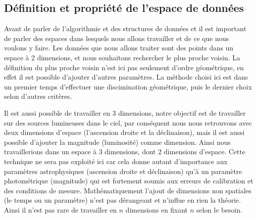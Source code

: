 	\subsection{Définition et propriété de l'espace de données}

Avant de parler de l'algorithmie et des structures de données et il est important de parler des espaces dans lesquels nous allons travailler et de ce que nous voulons y faire. Les données que nous allons traiter sont des points dans un espace à 2 dimensions, et nous souhaitons rechercher le plus proche voisin. La définition du plus proche voisin n'est ici pas seulement d'ordre géométrique, en effet il est possible d'ajouter d'autres paramètres. La méthode choisi ici est dans un premier temps d'effectuer une discimination géométrique, puis le dernier choix selon d'autres critères.


Il est aussi possible de travailler en 3 dimensions, notre objectif est de travailler sur des sources lumineuses dans le ciel, par conséquent nous nous retrouvons avec deux dimensions d'espace (l'ascension droite et la déclinaison), mais il est aussi possible d'ajouter la magnitude (luminosité) comme dimension. Ainsi nous travaillerions dans un espace à 3 dimensions, dont 2 dimensions d'espace. Cette technique ne sera pas exploité ici car cela donne autant d'importance aux paramètres astrophysiques (ascension droite et déclinaison) qu'à un paramètre photométrique (magnitude) qui est fortement soumis aux erreurs de calibration et des conditions de mesure. Mathématiquement l'ajout de dimensions non spatiales (le temps ou un paramètre) n'est pas dérangeant et n'influe en rien la théorie. Ainsi il n'est pas rare de travailler en $n$ dimensions en fixant $n$ selon le besoin.

